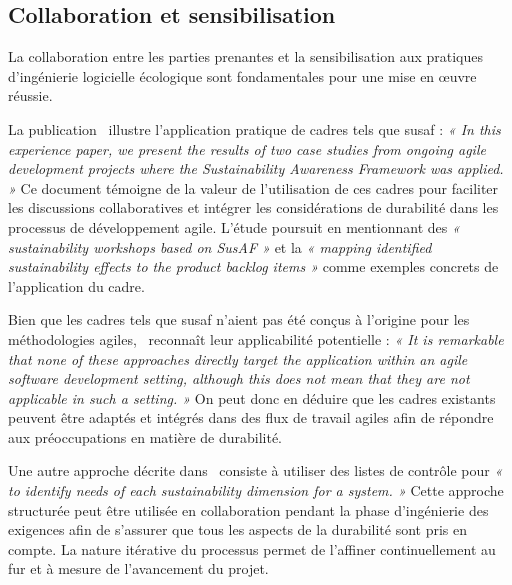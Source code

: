 
\subsection{Collaboration et sensibilisation}
La collaboration entre les parties prenantes et la sensibilisation aux pratiques d'ingénierie logicielle écologique sont fondamentales pour une mise en œuvre réussie.


La publication~\cite{SustainabilityAwarenessFramework} illustre l'application pratique de cadres tels que \acrshort{susaf} : \emph{« In this experience paper, we present the results of two case studies from ongoing agile development projects where the Sustainability Awareness Framework was applied. »} Ce document témoigne de la valeur de l'utilisation de ces cadres pour faciliter les discussions collaboratives et intégrer les considérations de durabilité dans les processus de développement agile. L'étude poursuit en mentionnant des \emph{« sustainability workshops based on SusAF »} et la \emph{« mapping identified sustainability effects to the product backlog items »} comme exemples concrets de l'application du cadre.


Bien que les cadres tels que \acrshort{susaf} n'aient pas été conçus à l'origine pour les méthodologies agiles,~\cite{SustainabilityRequirementsEngineering} reconnaît leur applicabilité potentielle : \emph{« It is remarkable that none of these approaches directly target the application within an agile software development setting, although this does not mean that they are not applicable in such a setting. »} On peut donc en déduire que les cadres existants peuvent être adaptés et intégrés dans des flux de travail agiles afin de répondre aux préoccupations en matière de durabilité.


Une autre approche décrite dans~\cite{SustainabilityRequirementsEngineering} consiste à utiliser des listes de contrôle pour \emph{« to identify needs of each sustainability dimension for a system. »} Cette approche structurée peut être utilisée en collaboration pendant la phase d'ingénierie des exigences afin de s'assurer que tous les aspects de la durabilité sont pris en compte. La nature itérative du processus permet de l'affiner continuellement au fur et à mesure de l'avancement du projet.


